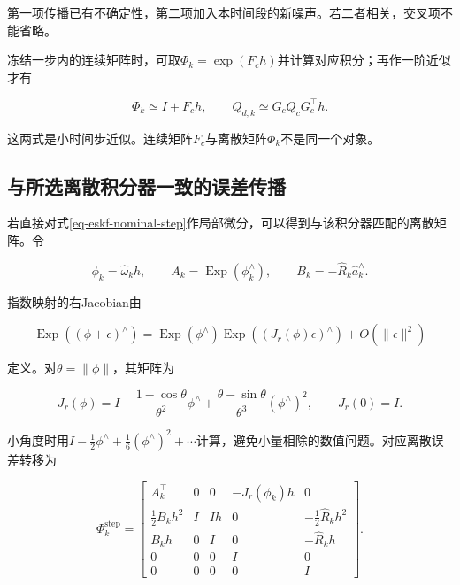 第一项传播已有不确定性，第二项加入本时间段的新噪声。若二者相关，交叉项不能省略。

冻结一步内的连续矩阵时，可取$\Phi_k=\exp(F_ch)$并计算对应积分；再作一阶近似才有

\begin{equation*}
\Phi_k\simeq I+F_ch,\qquad Q_{d,k}\simeq G_cQ_cG_c^\top h.
\end{equation*}

这两式是小时间步近似。连续矩阵$F_c$与离散矩阵$\Phi_k$不是同一个对象。

\subsection{与所选离散积分器一致的误差传播}

若直接对式\eqref{eq-eskf-nominal-step}作局部微分，可以得到与该积分器匹配的离散矩阵。令

\begin{equation*}
\phi_k=\hat\omega_kh,\qquad A_k=\mathop{\mathrm{Exp}}(\phi_k^\wedge),
 \qquad B_k=-\hat R_k\hat a_k^\wedge.
\end{equation*}

指数映射的右Jacobian由

\begin{equation*}
\mathop{\mathrm{Exp}}((\phi+\epsilon)^\wedge)
 =\mathop{\mathrm{Exp}}(\phi^\wedge)\mathop{\mathrm{Exp}}((J_r(\phi)\epsilon)^\wedge)
   +O(\|\epsilon\|^2)
\end{equation*}

定义。对$\theta=\|\phi\|$，其矩阵为

\begin{equation*}
J_r(\phi)=I-\frac{1-\cos\theta}{\theta^2}\phi^\wedge
              +\frac{\theta-\sin\theta}{\theta^3}(\phi^\wedge)^2,
 \qquad J_r(0)=I.
\end{equation*}

小角度时用$I-\frac12\phi^\wedge+\frac16(\phi^\wedge)^2+\cdots$计算，避免小量相除的数值问题。对应离散误差转移为

\begin{equation*}
\Phi_k^{\mathrm{step}}=\begin{bmatrix}
 A_k^\top&0&0&-J_r(\phi_k)h&0\\
 \tfrac12B_kh^2&I&Ih&0&-\tfrac12\hat R_kh^2\\
 B_kh&0&I&0&-\hat R_kh\\
 0&0&0&I&0\\
 0&0&0&0&I
 \end{bmatrix}.
\end{equation*}

